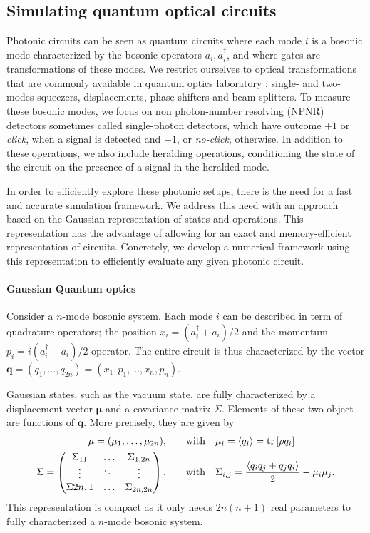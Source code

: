 \subsection{Simulating quantum optical circuits}

Photonic circuits can be seen as quantum circuits where each mode $i$ is a bosonic mode characterized by the bosonic operators $a_i,a_i^\dagger$, and where gates are transformations of these modes.
We restrict ourselves to optical transformations that are commonly available in quantum optics laboratory : single- and two-modes squeezers, displacements, phase-shifters and beam-splitters.
To measure these bosonic modes, we focus on non photon-number resolving (NPNR) detectors sometimes called single-photon detectors, which have outcome $+1$ or \textit{click}, when a signal is detected and $-1$, or \textit{no-click}, otherwise.
In addition to these operations, we also include heralding operations, conditioning the state of the circuit on the presence of a signal in the heralded mode.


In order to efficiently explore these photonic setups, there is the need for a fast and accurate simulation framework.
We address this need with an approach based on the Gaussian representation of states and operations.
This representation has the advantage of allowing for an exact and memory-efficient representation of circuits.
Concretely, we develop a numerical framework using this representation to efficiently evaluate any given photonic circuit.


\paragraph{Gaussian Quantum optics}

Consider a $n$-mode bosonic system. 
Each mode $i$ can be described in term of quadrature operators; the position $x_i=(a_i^\dagger+a_i)/2$ and the momentum $p_i=i(a_i^\dagger-a_i)/2$ operator.
The entire circuit is thus characterized by the vector $\mathbf{q}=(q_1,\dots,q_{2n})=(x_1,p_1,\dots,x_n,p_n)$.

Gaussian states, such as the vacuum state, are fully characterized by a displacement vector $\mathbf{\mu}$ and a covariance matrix $\Sigma$.
Elements of these two object are functions of $\mathbf{q}$.
More precisely, they are given by
\begin{align}
	\mathbf{\mu} = (\mu_1,\dots,\mu_{2n}), \qquad &\text{with}\quad \mu_i = \mean{q_i} = \trr{\rho q_i} \\
	\Sigma = \begin{pmatrix} \Sigma_{11} & \dots & \Sigma_{1,2n} \\
							\vdots & \ddots & \vdots \\
						\Sigma{2n,1} & \dots & \Sigma_{2n,2n}\end{pmatrix} , \qquad &\text{with}\quad \Sigma_{i,j} = \frac{\mean{q_i q_j + q_j q_i}}{2}-\mu_i \mu_j.
\end{align}
This representation is compact as it only needs $2n(n+1)$ real parameters to fully characterized a $n$-mode bosonic system.

